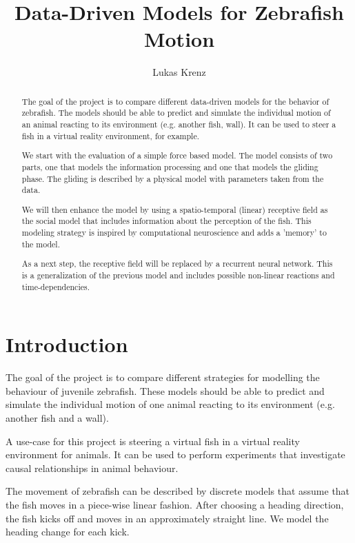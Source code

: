 \documentclass[nobib]{tufte-handout}
\title{Data-Driven Models for Zebrafish Motion}
\author[Lukas Krenz]{Lukas Krenz}
\begin{document}
\maketitle%

\begin{abstract}
\noindent
The goal of the project is to compare different data-driven models for the behavior of zebrafish.
The models should be able to predict and simulate the individual motion of an animal reacting to its environment (e.g. another fish, wall).
It can be used to steer a fish in a virtual reality environment, for example.

We start with the evaluation of a simple force based model.
The model consists of two parts, one that models the information processing and one that models the gliding phase.
The gliding is described by a physical model with parameters taken from the data.

We will then enhance the model by using a spatio-temporal (linear) receptive field as the social model that includes information about the perception of the fish.
This modeling strategy is inspired by computational neuroscience and adds a 'memory' to the model.

As a next step, the receptive field will be replaced by a recurrent neural network.
This is a generalization of the previous model and includes possible non-linear reactions and time-dependencies.
\end{abstract}

\section{Introduction}
The goal of the project is to compare different strategies for modelling the behaviour of juvenile zebrafish.
These models should be able to predict and simulate the individual motion of one animal reacting to its environment (e.g. another fish and a wall).

A use-case for this project is steering a virtual fish in a virtual reality environment for animals.
It can be used to perform experiments that investigate causal relationships in animal behaviour.

The movement of zebrafish can be described by discrete models that assume that the fish moves in a piece-wise linear fashion.
After choosing a heading direction, the fish kicks off and moves in an approximately straight line.
We model the heading change for each kick.
\end{document}
